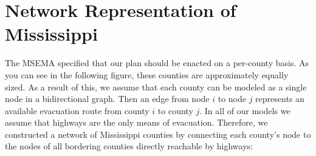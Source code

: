 \documentclass[titlepage]{article}
\begin{document}
\section{Network Representation of Mississippi}
\label{sec:representation}
  \par
    The MSEMA specified that our plan should be enacted on a per-county basis. As you can see in the following figure, these counties are approximately equally sized. As a result of this, we assume that each county can be modeled as a single node in a bidirectional graph. Then an edge from node $i$ to node $j$ represents an available evacuation route from county $i$ to county $j$. In all of our models we assume that highways are the only means of evacuation. Therefore, we constructed a network of Mississippi counties by connecting each county's node to the nodes of all bordering counties directly reachable by highways:
\end{document}
